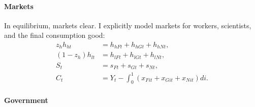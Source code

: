 


  
\paragraph{Markets}
In equilibrium, markets clear. I explicitly model markets for workers, scientists, and the final consumption good:
\begin{align*}
z_h h_{ht}&=h_{hFt}+h_{hGt}+h_{hNt},\\
(1-z_h) h_{lt}&=h_{lFt}+h_{lGt}+h_{lNt},\\
S_t&=s_{Ft}+s_{Gt}+s_{Nt},\\
C_t&=Y_t-\int_{0}^{1}\left(x_{Fit}+x_{Git}+x_{Nit}\right)di.  %
\end{align*}

\paragraph{Government}


